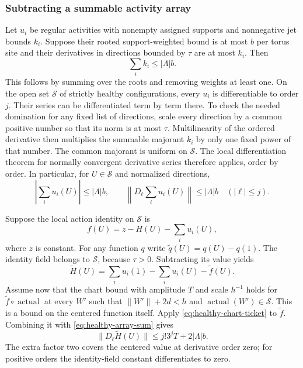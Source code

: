 \subsubsection{Subtracting a summable activity array}
Let $u_i$ be regular activities with nonempty assigned supports and
nonnegative jet bounds $k_i$. Suppose their rooted support-weighted
bound is at most $b$ per torus site and their derivatives in directions
bounded by $\tau$ are at most $k_i$. Then
\[
                     \sum_i k_i\le |\Lambda|b.
\]
This follows by summing over the roots and removing weights at least
one. On the open set $\mathcal S$ of strictly healthy configurations,
every $u_i$ is differentiable to order $j$. Their series can be
differentiated term by term there. To check the needed domination
for any fixed list of directions, scale every direction by a common
positive number so that its norm is at most $\tau$. Multilinearity
of the ordered derivative then multiplies the summable majorant
$k_i$ by only one fixed power of that number. The common majorant
is uniform on $\mathcal S$. The local differentiation theorem for
normally convergent derivative series therefore applies, order by
order. In particular, for $U\in\mathcal S$ and normalized directions,
\begin{equation}\label{eq:healthy-array-sum}
 \left|\sum_i u_i(U)\right|\le|\Lambda|b,\qquad
 \left\|D_\ell\sum_i u_i(U)\right\|\le|\Lambda|b
                                  \quad(|\ell|\le j).
\end{equation}

Suppose the local action identity on $\mathcal S$ is
\[
                      f(U)=z-H(U)-\sum_i u_i(U),
\]
where $z$ is constant. For any function $q$ write
$\widetilde q(U)=q(U)-q(1)$. The identity field belongs to
$\mathcal S$, because $\tau>0$. Subtracting its value yields
\[
              \widetilde H(U)
             =\sum_i u_i(1)-\sum_i u_i(U)-\widetilde f(U).
\]
Assume now that the chart bound with amplitude $T$ and scale $h^{-1}$
holds for $\widetilde f\circ\operatorname{actual}$ at every $W' $
such that $\|W'\|+2d<h$ and $\operatorname{actual}(W')\in\mathcal S$.
This is a bound on the centered function itself. Apply
\eqref{eq:healthy-chart-ticket} to $\widetilde f$. Combining it with
\eqref{eq:healthy-array-sum} gives
\begin{equation}\label{eq:healthy-interior-remainder}
          \|D_\ell\widetilde H(U)\|
                   \le j!3^jT+2|\Lambda|b.
\end{equation}
The extra factor two covers the centered value at derivative order
zero; for positive orders the identity-field constant differentiates
to zero.

